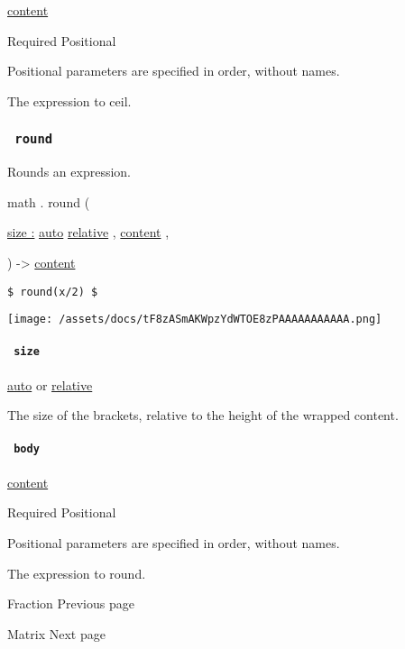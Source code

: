 \href{/docs/reference/foundations/content/}{content}

{Required} {{ Positional }}

\label{functions-ceil-body-positional-tooltip}
Positional parameters are specified in order, without names.

The expression to ceil.

\subsubsection{\texorpdfstring{\texttt{\ round\ }}{ round }}\label{functions-round}

Rounds an expression.

math { . } { round } (

{ \hyperref[functions-round-parameters-size]{size :}
\href{/docs/reference/foundations/auto/}{auto}
\href{/docs/reference/layout/relative/}{relative} , } {
\href{/docs/reference/foundations/content/}{content} , }

) -\textgreater{} \href{/docs/reference/foundations/content/}{content}

\begin{verbatim}
$ round(x/2) $
\end{verbatim}

\texttt{[image: /assets/docs/tF8zASmAKWpzYdWTOE8zPAAAAAAAAAAA.png]}

\paragraph{\texorpdfstring{\texttt{\ size\ }}{ size }}\label{functions-round-size}

\href{/docs/reference/foundations/auto/}{auto} {or}
\href{/docs/reference/layout/relative/}{relative}

The size of the brackets, relative to the height of the wrapped content.

\paragraph{\texorpdfstring{\texttt{\ body\ }}{ body }}\label{functions-round-body}

\href{/docs/reference/foundations/content/}{content}

{Required} {{ Positional }}

\label{functions-round-body-positional-tooltip}
Positional parameters are specified in order, without names.

The expression to round.

\href{/docs/reference/math/frac/}{\pandocbounded{}}

{ Fraction } { Previous page }

\href{/docs/reference/math/mat/}{\pandocbounded{}}

{ Matrix } { Next page }
